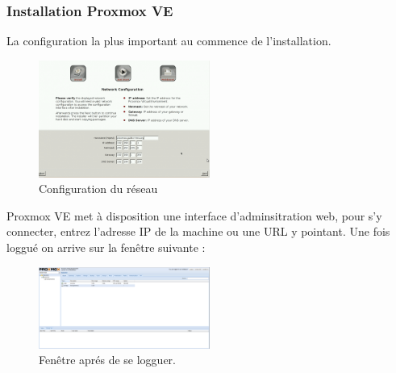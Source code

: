 \documentclass[a4paper,11pt]{report}
\begin{document}
\subsubsection{Installation Proxmox VE}
La configuration la plus important au commence de l'installation.
\begin{figure} [h]
\begin {center}
\includegraphics[width=0.5\textwidth]{img/installation.png}
\caption{Configuration du réseau }
\end {center}
\end{figure}

Proxmox VE met à disposition une interface d’adminsitration web, pour s’y connecter, entrez l’adresse IP de la machine ou une URL y pointant. Une fois loggué on arrive sur la fenêtre suivante :

\begin{figure} [h]
\begin {center}
\includegraphics[width=0.5\textwidth]{img/premiere.png}
\caption{Fenêtre aprés de se logguer. }
\end {center}
\end{figure}
\end{document}
